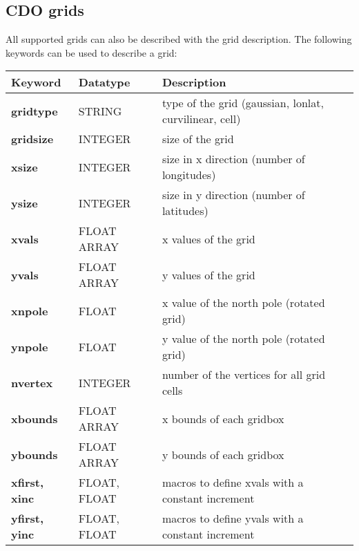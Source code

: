 \subsection{CDO grids}

All supported grids can also be described with the {\CDO} grid description.
The following keywords can be used to describe a grid:

\vspace{3mm}
\begin{tabular}[b]{lll}
Keyword           & Datatype     & Description \\ \hline
\bf{gridtype}     & STRING       & type of the grid (gaussian, lonlat, curvilinear, cell) \\
\bf{gridsize}     & INTEGER      & size of the grid \\
\bf{xsize}        & INTEGER      & size in x direction (number of longitudes) \\
\bf{ysize}        & INTEGER      & size in y direction (number of latitudes) \\
\bf{xvals}        & FLOAT ARRAY  & x values of the grid \\
\bf{yvals}        & FLOAT ARRAY  & y values of the grid \\
\bf{xnpole}       & FLOAT        & x value of the north pole (rotated grid) \\
\bf{ynpole}       & FLOAT        & y value of the north pole (rotated grid) \\
\bf{nvertex}      & INTEGER      & number of the vertices for all grid cells \\
\bf{xbounds}      & FLOAT ARRAY  & x bounds of each gridbox \\
\bf{ybounds}      & FLOAT ARRAY  & y bounds of each gridbox \\
\bf{xfirst, xinc} & FLOAT, FLOAT & macros to define xvals with a constant increment \\
\bf{yfirst, yinc} & FLOAT, FLOAT & macros to define yvals with a constant increment \\
\end{tabular}

